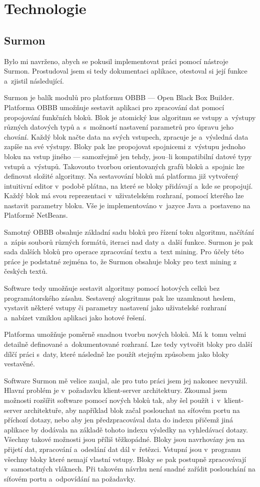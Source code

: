 \section{Technologie}
\subsection{Surmon}
Bylo mi navrženo, abych se pokusil implementovat práci pomocí nástroje Surmon. Prostudoval jsem si tedy  dokumentaci aplikace, otestoval si její funkce a~zjistil následující.

Surmon je balík modulů pro platformu OBBB\cite{surmon:guide} — Open Black Box Builder. Platforma OBBB umožňuje sestavit aplikaci pro zpracování dat pomocí propojování funkčních bloků. Blok je atomický kus algoritmu se vstupy a~výstupy různých datových typů a~s~možností nastavení parametrů pro úpravu jeho chování. Každý blok načte data na svých vstupech, zpracuje je a~výsledná data zapíše na své výstupy. Bloky pak lze propojovat spojnicemi z~výstupu jednoho bloku na vstup jiného — samozřejmě jen tehdy, jsou–li kompatibilní datové typy vstupů a~výstupů.  Takovouto tvorbou orientovaných grafů bloků a~spojnic lze definovat složité algoritmy. Na sestavování bloků má platforma již vytvořený intuitivní editor v~podobě plátna, na které se bloky přidávají a~kde se propojují. Každý blok má svou reprezentaci v~uživatelském rozhraní, pomocí kterého lze nastavit parametry bloku. Vše je implementováno v~jazyce Java a~postaveno na Platformě NetBeans\cite{netbeans:guide}.

Samotný OBBB obsahuje základní sadu bloků pro řízení toku algoritmu, načítání a~zápis souborů různých formátů, iteraci nad daty a~další funkce. Surmon je pak sada dalších bloků pro operace zpracování textu a~text mining. Pro účely této práce je podstatné zejména to, že Surmon obsahuje bloky pro text mining z českých textů.

Software tedy umožňuje sestavit algoritmy pomocí hotových celků bez programátorského zásahu. Sestavený alogritmus pak lze uzamknout heslem, vystavit některé vstupy či parametry nastavení jako uživatelské rozhraní a~nabízet vzniklou aplikaci jako hotové řešení.

Platforma umožňuje poměrně snadnou tvorbu nových bloků. Má k~tomu velmi detailně definované a~dokumentované rozhraní. Lze tedy vytvořit bloky pro další dílčí práci s~daty, které následně lze použít stejným způsobem jako bloky vestavěné.

Software Surmon mě velice zaujal, ale pro tuto práci jsem jej nakonec nevyužil. Hlavní problém je v~požadavku klient-server architektury. Zkoumal jsem možnosti rozšířit software pomocí nových bloků tak, aby šel použít i~v~klient-server architektuře, aby například blok začal poslouchat na síťovém portu na příchozí dotazy, nebo aby jen předzpracovával data do indexu přičemž jiná aplikace by dodávala na základě tohoto indexu výsledky na vyhledávací dotazy. Všechny takové možnosti jsou příliš těžkopádné. Bloky jsou navrhovány jen na přijetí dat, zpracování a~odeslání dat dál v~řetězci. Vstupní  jsou v~programu všechny bloky které nemají vlastní vstupy. Bloky se pak postupně zpracovávají v~samostatných vláknech. Při takovém návrhu není snadné zařídit poslouchání na síťovém portu a~odpovídání na požadavky.


